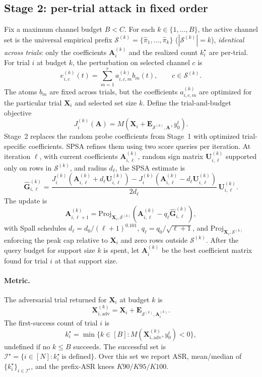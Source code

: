 \documentclass[11pt]{article}
\begin{document}
\subsection{Stage 2: per-trial attack in fixed order}
Fix a maximum channel budget $B<C$. For each $k\in\{1,\ldots,B\}$, the active channel set
is the universal empirical prefix
$\mathcal{S}^{(k)}=\{\widehat\pi_1,\dots,\widehat\pi_k\}$
($|\mathcal{S}^{(k)}|=k$), \emph{identical across trials}: only the coefficients
$\mathbf{A}_i^{(k)}$ and the realized count $k_i^\star$ are per-trial. For trial $i$ at
budget $k$, the perturbation on selected channel $c$ is
\[
e_{i,c}^{(k)}(t)=\sum_{m=1}^{r} a_{i,c,m}^{(k)}b_m(t),\qquad c\in\mathcal{S}^{(k)}.
\]
The atoms $b_m$ are fixed across trials, but the coefficients $a_{i,c,m}^{(k)}$ are
optimized for the particular trial $\mathbf{X}_i$ and selected set size $k$. Define the
trial-and-budget objective
\[
J_i^{(k)}(\mathbf{A})=M(\mathbf{X}_i+\mathbf{E}_{\mathcal{S}^{(k)},\mathbf{A}},y_0^i).
\]
Stage~2 replaces the random probe coefficients from Stage~1 with optimized
trial-specific coefficients. SPSA refines them using two score queries per iteration.
At iteration $\ell$, with current coefficients $\mathbf{A}_{i,\ell}^{(k)}$, random sign
matrix $\mathbf{U}_{i,\ell}^{(k)}$ supported only on rows in $\mathcal{S}^{(k)}$, and radius
$d_\ell$, the SPSA estimate is
\[
\widehat{\mathbf{G}}_{i,\ell}^{(k)}
=\frac{
J_i^{(k)}(\mathbf{A}_{i,\ell}^{(k)}+d_\ell\mathbf{U}_{i,\ell}^{(k)})
-J_i^{(k)}(\mathbf{A}_{i,\ell}^{(k)}-d_\ell\mathbf{U}_{i,\ell}^{(k)})
}{2d_\ell}\,\mathbf{U}_{i,\ell}^{(k)}.
\]
The update is
\[
\mathbf{A}_{i,\ell+1}^{(k)}
=\mathrm{Proj}_{\mathbf{X}_i,\mathcal{S}^{(k)}}\!\left(
\mathbf{A}_{i,\ell}^{(k)}-q_\ell\widehat{\mathbf{G}}_{i,\ell}^{(k)}
\right),
\]
with Spall schedules $d_\ell=d_0/(\ell+1)^{0.101}$, $q_\ell=q_0/\sqrt{\ell+1}$, and
$\mathrm{Proj}_{\mathbf{X}_i,\mathcal{S}^{(k)}}$ enforcing the peak cap relative to
$\mathbf{X}_i$ and zero rows outside $\mathcal{S}^{(k)}$. After the query budget for support size
$k$ is spent, let $\mathbf{A}_i^{(k)}$ be the best coefficient matrix found for trial
$i$ at that support size.

\paragraph{Metric.} The adversarial trial returned for $\mathbf{X}_i$ at budget $k$ is
\[
\mathbf{X}_{i,\mathrm{adv}}^{(k)}
=\mathbf{X}_i+\mathbf{E}_{\mathcal{S}^{(k)},\mathbf{A}_i^{(k)}}.
\]
The first-success count of trial $i$ is
\[
k_i^\star=\min\{k\in[B]:M(\mathbf{X}_{i,\mathrm{adv}}^{(k)},y_0^i)<0\},
\]
undefined if no $k\le B$ succeeds. The successful set is
$\mathcal{I}^\star=\{i\in[N]:k_i^\star\ \text{is defined}\}$. Over this set we report ASR,
mean/median of
$\{k_i^\star\}_{i\in\mathcal{I}^\star}$, and the prefix-ASR knees $K90/K95/K100$.
\end{document}
